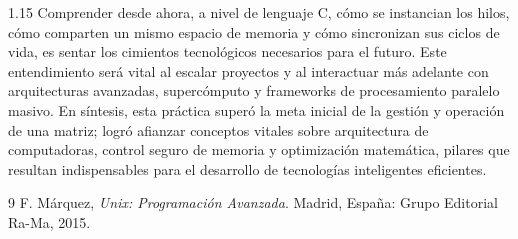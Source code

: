 \documentclass[11pt, a4paper]{article}
\begin{document}
\begin{spacing}{1.15}
Comprender desde ahora, a nivel de lenguaje C, cómo se instancian los hilos, cómo comparten un mismo espacio de memoria y cómo sincronizan sus ciclos de vida, es sentar los cimientos tecnológicos necesarios para el futuro. Este entendimiento será vital al escalar proyectos y al interactuar más adelante con arquitecturas avanzadas, 
supercómputo y frameworks de procesamiento paralelo masivo. En síntesis, esta práctica superó la meta inicial de la gestión y operación de una matriz; logró afianzar conceptos vitales sobre arquitectura de computadoras, control seguro de memoria y optimización matemática, pilares que resultan indispensables para el desarrollo de tecnologías inteligentes eficientes.

\vspace{1cm} %

\renewcommand{\refname}{Referencias}
\begin{thebibliography}{9}
F. Márquez, \textit{Unix: Programación Avanzada}. Madrid, España: Grupo Editorial Ra-Ma, 2015.
\end{thebibliography}

\end{spacing}
\end{document}
